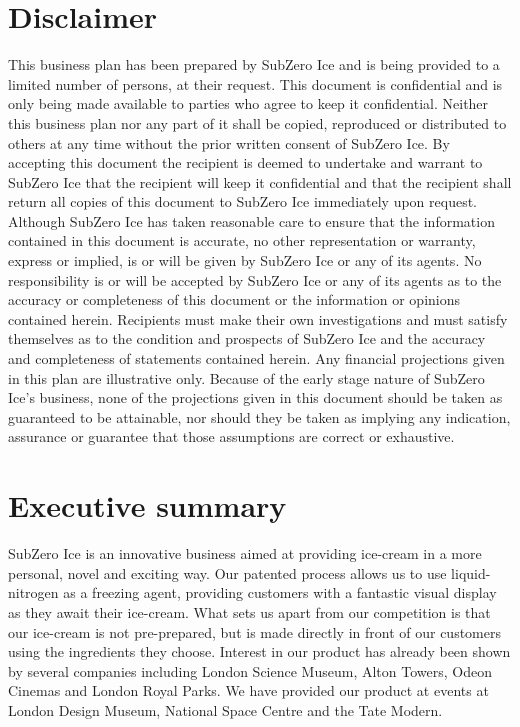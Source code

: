\documentclass{article}
\begin{document}
\section{Disclaimer}
This business plan has been prepared by SubZero Ice and is being provided to a limited number of persons, at their request.  This document is confidential and is only being made available to parties who agree to keep it confidential.  Neither this business plan nor any part of it shall be copied, reproduced or distributed to others at any time without the prior written consent of SubZero Ice. By accepting this document the recipient is deemed to undertake and warrant to SubZero Ice that the recipient will keep it confidential and that the recipient shall return all copies of this document to SubZero Ice immediately upon request.
Although SubZero Ice has taken reasonable care to ensure that the information contained in this document is accurate, no other representation or warranty, express or implied, is or will be given by SubZero Ice or any of its agents.  No responsibility is or will be accepted by SubZero Ice or any of its agents as to the accuracy or completeness of this document or the information or opinions contained herein.  Recipients must make their own investigations and must satisfy themselves as to the condition and prospects of SubZero Ice and the accuracy and completeness of statements contained herein.
Any financial projections given in this plan are illustrative only.  Because of the early stage nature of SubZero Ice’s business, none of the projections given in this document should be taken as guaranteed to be attainable, nor should they be taken as implying any indication, assurance or guarantee that those assumptions are correct or exhaustive.

\pagebreak

\tableofcontents

\pagebreak


\section{Executive summary}

SubZero Ice is an innovative business aimed at providing ice-cream in a more personal, novel and exciting way. Our patented process allows us to use liquid-nitrogen as a freezing agent, providing customers with a fantastic visual display as they await their ice-cream. What sets us apart from our competition is that our ice-cream is not pre-prepared, but is made directly in front of our customers using the ingredients they choose. 
Interest in our product has already been shown by several companies including London Science Museum, Alton Towers, Odeon Cinemas and London Royal Parks. We have provided our product at events at London Design Museum, National Space Centre and the Tate Modern.
\end{document}

